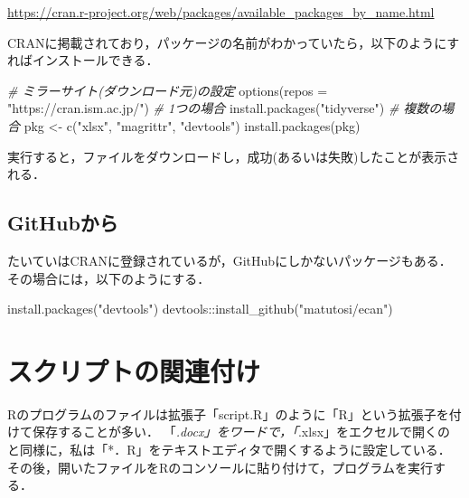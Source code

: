 \documentclass[
]{article}
\newenvironment{Shaded}{\begin{snugshade}}{\end{snugshade}}
\newcommand{\AttributeTok}[1]{\textcolor[rgb]{0.77,0.63,0.00}{#1}}
\newcommand{\CommentTok}[1]{\textcolor[rgb]{0.56,0.35,0.01}{\textit{#1}}}
\newcommand{\FunctionTok}[1]{\textcolor[rgb]{0.00,0.00,0.00}{#1}}
\newcommand{\NormalTok}[1]{#1}
\newcommand{\OtherTok}[1]{\textcolor[rgb]{0.56,0.35,0.01}{#1}}
\newcommand{\SpecialCharTok}[1]{\textcolor[rgb]{0.00,0.00,0.00}{#1}}
\newcommand{\StringTok}[1]{\textcolor[rgb]{0.31,0.60,0.02}{#1}}
\begin{document}
\url{https://cran.r-project.org/web/packages/available_packages_by_name.html}

CRANに掲載されており，パッケージの名前がわかっていたら，以下のようにすればインストールできる．

\begin{Shaded}
\begin{Highlighting}[]
  \CommentTok{\# ミラーサイト(ダウンロード元)の設定}
\FunctionTok{options}\NormalTok{(}\AttributeTok{repos =} \StringTok{"https://cran.ism.ac.jp/"}\NormalTok{)}
  \CommentTok{\# 1つの場合}
\FunctionTok{install.packages}\NormalTok{(}\StringTok{"tidyverse"}\NormalTok{)}
  \CommentTok{\# 複数の場合}
\NormalTok{pkg }\OtherTok{\textless{}{-}} \FunctionTok{c}\NormalTok{(}\StringTok{"xlsx"}\NormalTok{, }\StringTok{"magrittr"}\NormalTok{, }\StringTok{"devtools"}\NormalTok{)}
\FunctionTok{install.packages}\NormalTok{(pkg)}
\end{Highlighting}
\end{Shaded}

実行すると，ファイルをダウンロードし，成功(あるいは失敗)したことが表示される．

\hypertarget{github}{%
\subsection{GitHubから}\label{github}}

たいていはCRANに登録されているが，GitHubにしかないパッケージもある．
その場合には，以下のようにする．

\begin{Shaded}
\begin{Highlighting}[]
\FunctionTok{install.packages}\NormalTok{(}\StringTok{"devtools"}\NormalTok{)}
\NormalTok{devtools}\SpecialCharTok{::}\FunctionTok{install\_github}\NormalTok{(}\StringTok{"matutosi/ecan"}\NormalTok{)}
\end{Highlighting}
\end{Shaded}

\hypertarget{assoc}{%
\section{スクリプトの関連付け}\label{assoc}}

Rのプログラムのファイルは拡張子「script.R」のように「R」という拡張子を付けて保存することが多い．
「\emph{.docx」をワードで，「}.xlsx」をエクセルで開くのと同様に，私は「*．R」をテキストエディタで開くするように設定している．
その後，開いたファイルをRのコンソールに貼り付けて，プログラムを実行する．
\end{document}
